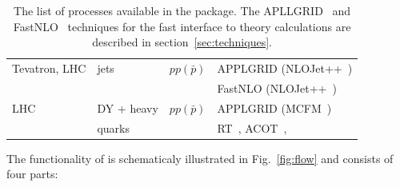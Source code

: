 \begin{table}
\begin{tabular}{|l|l|l|l|}
Tevatron, LHC &jets &$pp(\bar p)$ & APPLGRID (NLOJet++~\cite{Nagy:1998bb,Nagy:2001fj}) \\
                &  & & FastNLO (NLOJet++~\cite{Nagy:1998bb,Nagy:2001fj}) \\
LHC& DY + heavy &$pp(\bar p)$ & APPLGRID (MCFM~\cite{Campbell:1999ah,Campbell:2000je,Campbell:2010ff}) \\
   & quarks     &                 & RT~\cite{Thorne:1997ga,Thorne:2006qt,Martin:epC63,Thorne:6180}, ACOT~\cite{CWZ}, \\
\hline
\end{tabular}
\caption{The list of processes available in the \fitter package. 
The APLLGRID~\cite{Carli:2010rw} and FastNLO~\cite{Kluge:2006xs,Wobisch:2011ij,Britzger:2012bs} 
techniques for the fast interface to theory calculations are described in section~\ref{sec:techniques}.} 
\label{tab:proc}
\end{table}
%
\normalsize
The functionality of \fitter is schematicaly illustrated in Fig.~\ref{fig:flow} and consists of four parts: %

